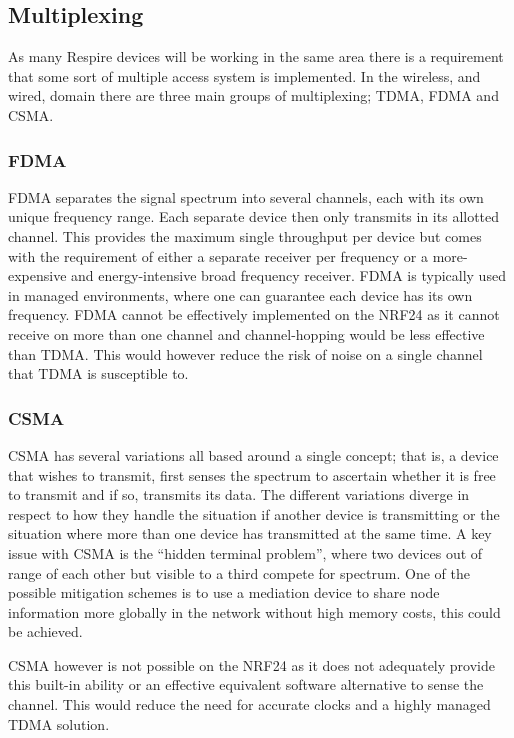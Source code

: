\subsection{Multiplexing}
As many Respire devices will be working in the same area there is a requirement that some sort of
multiple access system is implemented. In the wireless, and wired, domain there are three main
groups of multiplexing; \ac{TDMA}, \ac{FDMA} and \ac{CSMA}.

\subsubsection{\acf{FDMA}}
FDMA separates the signal spectrum into several channels, each with its own unique frequency
range. Each separate device then only transmits in its allotted channel. This provides the maximum
single throughput per device but comes with the requirement of either a separate receiver per
frequency or a more-expensive and energy-intensive broad frequency receiver. \ac{FDMA} is typically
used in managed environments, where one can guarantee each device has its own frequency.
\ac{FDMA} cannot be effectively implemented on the \ac{NRF24} as it cannot receive on more than one
channel and channel-hopping would be less effective than \ac{TDMA}. This would however reduce the
risk of noise on a single channel that \ac{TDMA} is susceptible to.

\subsubsection{\acf{CSMA}}
\ac{CSMA} has several variations all based around a single concept; that is, a device that wishes to
transmit, first senses the spectrum to ascertain whether it is free to transmit and if so, transmits its
data. The different variations diverge in respect to how they handle the situation if another device is
transmitting or the situation where more than one device has transmitted at the same time.
A key issue with \ac{CSMA} is the ``hidden terminal problem'', where two devices out of range of each
other but visible to a third compete for spectrum. One of the possible mitigation schemes is to use a
mediation device to share node information more globally in the network without high memory
costs, this could be achieved.


\ac{CSMA} however is not possible on the \ac{NRF24} as it does not adequately provide this built-in
ability or an effective equivalent software alternative to sense the channel. This would reduce the
need for accurate clocks and a highly managed \ac{TDMA} solution.


